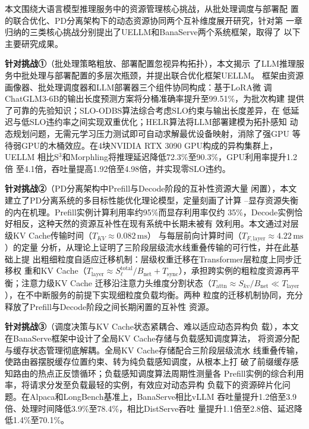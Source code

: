 

\begin{conclusion}

本文围绕大语言模型推理服务中的资源管理核心挑战，从批处理调度与部署配
置的联合优化、PD分离架构下的动态资源协同两个互补维度展开研究，针对第
一章归纳的三类核心挑战分别提出了UELLM和BanaServe两个系统框架，取得了
以下主要研究成果。

\textbf{针对挑战①}（批处理策略粗放、部署配置忽视异构拓扑），本文揭示
了LLM推理服务中批处理与部署配置的多层次瓶颈，并提出联合优化框架UELLM。
框架由资源画像器、批处理调度器和LLM部署器三个组件协同构成：基于LoRA微
调ChatGLM3-6B的输出长度预测方案将分桶准确率提升至99.51\%，为批次构建
提供了可靠的先验知识；SLO-ODBS算法综合考虑SLO约束与输出长度差异，在
低延迟与低SLO违约率之间实现双重优化；HELR算法将LLM部署建模为拓扑感知
动态规划问题，无需元学习压力测试即可自动求解最优设备映射，消除了强GPU
等待弱GPU的木桶效应。在4块NVIDIA RTX 3090 GPU构成的异构集群上，UELLM
相比S$^3$和Morphling将推理延迟降低72.3\%至90.3\%，GPU利用率提升1.2倍
至4.1倍，吞吐量提高1.92倍至4.98倍，并实现零SLO违约。

\textbf{针对挑战②}（PD分离架构中Prefill与Decode阶段的互补性资源大量
闲置），本文建立了PD分离系统的多目标性能优化理论模型，定量刻画了计算
--显存资源失衡的内在机理。Prefill实例计算利用率约95\%而显存利用率仅约
35\%，Decode实例恰好相反，这种天然的资源互补性在现有系统中长期未被有
效利用。本文通过对层级KV Cache传输时间（$T_{KV}\approx 0.082\,\text{ms}$）
与每层前向计算时间（$T_{F,\text{layer}}\approx 4.22\,\text{ms}$）的定量
分析，从理论上证明了三阶段层级流水线重叠传输的可行性，并在此基础上提
出粗细粒度自适应迁移机制：层级权重迁移在Transformer层粒度上同步迁移权
重和KV Cache（$T_{\text{layer}} \approx S^{\text{total}}_\ell/B_{\text{net}}
+ T_{\text{sync}}$），承担跨实例的粗粒度资源再平衡；注意力级KV Cache
迁移沿注意力头维度分割状态（$T_{\text{attn}}\approx S_{kv}/B_{\text{net}}
\ll T_{\text{layer}}$），在不中断服务的前提下实现细粒度负载均衡。两种
粒度的迁移机制协同，充分释放了Prefill与Decode阶段之间长期闲置的互补性
资源。

\textbf{针对挑战③}（调度决策与KV Cache状态紧耦合、难以适应动态异构负
载），本文在BanaServe框架中设计了全局KV Cache存储与负载感知调度算法，
将资源分配与缓存状态管理彻底解耦。全局KV Cache存储配合三阶段层级流水
线重叠传输，使路由器摆脱缓存位置约束、转为纯负载感知调度，从根本上打
破了前缀缓存感知路由的热点正反馈循环；负载感知调度算法周期性测量各
Prefill实例的综合利用率，将请求分发至负载最轻的实例，有效应对动态异构
负载下的资源碎片化问题。在Alpaca和LongBench基准上，BanaServe相比vLLM
吞吐量提升1.2倍至3.9倍、处理时间降低3.9\%至78.4\%，相比DistServe吞吐
量提升1.1倍至2.8倍、延迟降低1.4\%至70.1\%。


\end{conclusion}
